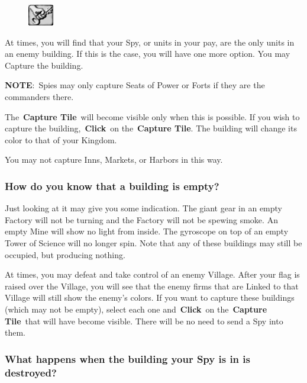 
\begin{figure}
	\vspace{-20pt}
	\begin{center}
		\includegraphics[width=0.1\textwidth]{Tcapture}
	\end{center}
	\vspace{-20pt}
\end{figure}

At times, you will find that your Spy, or units in your pay, are the only units in an enemy building. If this is the case, you will have one more option. You may Capture the building.

\textbf{NOTE}: Spies may only capture Seats of Power or Forts if they are the commanders there.

The \textbf{Capture Tile} will become visible only when this is possible. If you wish to capture the building, \textbf{Click} on the \textbf{Capture Tile}. The building will change its color to that of your Kingdom.

You may not capture Inns, Markets, or Harbors in this way.

\subsubsection{How do you know that a building is empty?}

Just looking at it may give you some indication. The giant gear in an empty Factory will not be turning and the Factory will not be spewing smoke. An empty Mine will show no light from inside. The gyroscope on top of an empty Tower of Science will no longer spin. Note that any of these buildings may still be occupied, but producing nothing.

At times, you may defeat and take control of an enemy Village. After your flag is raised over the Village, you will see that the enemy firms that are Linked to that Village will still show the enemy’s colors. If you want to capture these buildings (which may not be empty), select each one and \textbf{Click} on the \textbf{Capture Tile} that will have become visible. There will be no need to send a Spy into them.

\subsubsection{What happens when the building your Spy is in is destroyed?}

